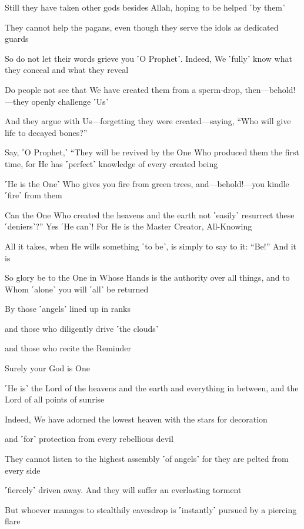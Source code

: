 Still they have taken other gods besides Allah, hoping to be helped ˹by them˺

They cannot help the pagans, even though they serve the idols as dedicated guards

So do not let their words grieve you ˹O Prophet˺. Indeed, We ˹fully˺ know what they conceal and what they reveal

Do people not see that We have created them from a sperm-drop, then—behold!—they openly challenge ˹Us˺

And they argue with Us—forgetting they were created—saying, “Who will give life to decayed bones?”

Say, ˹O Prophet,˺ “They will be revived by the One Who produced them the first time, for He has ˹perfect˺ knowledge of every created being

˹He is the One˺ Who gives you fire from green trees, and—behold!—you kindle ˹fire˺ from them

Can the One Who created the heavens and the earth not ˹easily˺ resurrect these ˹deniers˺?” Yes ˹He can˺! For He is the Master Creator, All-Knowing

All it takes, when He wills something ˹to be˺, is simply to say to it: “Be!” And it is

So glory be to the One in Whose Hands is the authority over all things, and to Whom ˹alone˺ you will ˹all˺ be returned

By those ˹angels˺ lined up in ranks

and those who diligently drive ˹the clouds˺

and those who recite the Reminder

Surely your God is One

˹He is˺ the Lord of the heavens and the earth and everything in between, and the Lord of all points of sunrise

Indeed, We have adorned the lowest heaven with the stars for decoration

and ˹for˺ protection from every rebellious devil

They cannot listen to the highest assembly ˹of angels˺ for they are pelted from every side

˹fiercely˺ driven away. And they will suffer an everlasting torment

But whoever manages to stealthily eavesdrop is ˹instantly˺ pursued by a piercing flare

